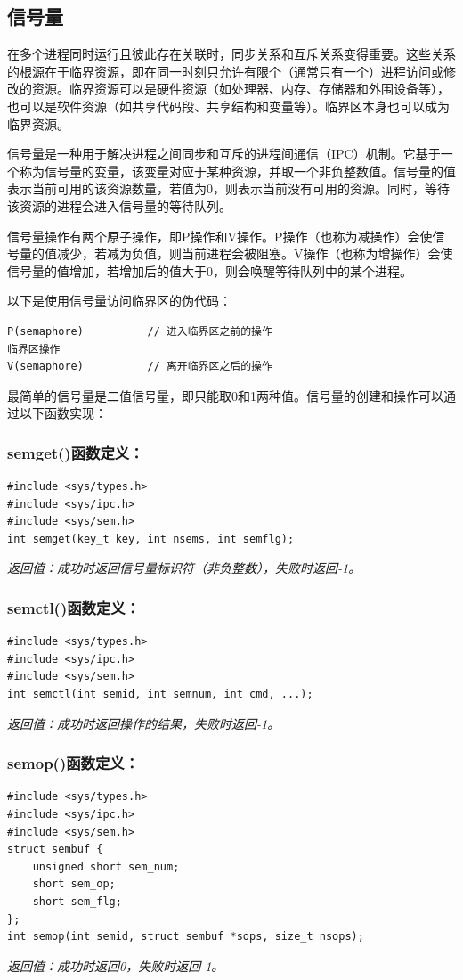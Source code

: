 \documentclass[12pt, a4paper, oneside]{ctexbook}
\numberwithin{figure}{section}
\begin{document}
\subsection{信号量}
在多个进程同时运行且彼此存在关联时，同步关系和互斥关系变得重要。这些关系的根源在于临界资源，即在同一时刻只允许有限个（通常只有一个）进程访问或修改的资源。临界资源可以是硬件资源（如处理器、内存、存储器和外围设备等），也可以是软件资源（如共享代码段、共享结构和变量等）。临界区本身也可以成为临界资源。

信号量是一种用于解决进程之间同步和互斥的进程间通信（IPC）机制。它基于一个称为信号量的变量，该变量对应于某种资源，并取一个非负整数值。信号量的值表示当前可用的该资源数量，若值为0，则表示当前没有可用的资源。同时，等待该资源的进程会进入信号量的等待队列。

信号量操作有两个原子操作，即P操作和V操作。P操作（也称为减操作）会使信号量的值减少，若减为负值，则当前进程会被阻塞。V操作（也称为增操作）会使信号量的值增加，若增加后的值大于0，则会唤醒等待队列中的某个进程。

以下是使用信号量访问临界区的伪代码：
\begin{verbatim}
P(semaphore)          // 进入临界区之前的操作
临界区操作
V(semaphore)          // 离开临界区之后的操作
\end{verbatim}

最简单的信号量是二值信号量，即只能取0和1两种值。信号量的创建和操作可以通过以下函数实现：

\subsubsection{semget()函数定义：}
\begin{verbatim}
#include <sys/types.h>
#include <sys/ipc.h>
#include <sys/sem.h>
int semget(key_t key, int nsems, int semflg);
\end{verbatim}
\emph{返回值：成功时返回信号量标识符（非负整数），失败时返回-1。}

\subsubsection{semctl()函数定义：}
\begin{verbatim}
#include <sys/types.h>
#include <sys/ipc.h>
#include <sys/sem.h>
int semctl(int semid, int semnum, int cmd, ...);
\end{verbatim}
\emph{返回值：成功时返回操作的结果，失败时返回-1。}

\subsubsection{semop()函数定义：}
\begin{verbatim}
#include <sys/types.h>
#include <sys/ipc.h>
#include <sys/sem.h>
struct sembuf {
    unsigned short sem_num;
    short sem_op;
    short sem_flg;
};
int semop(int semid, struct sembuf *sops, size_t nsops);
\end{verbatim}
\emph{返回值：成功时返回0，失败时返回-1。}
\end{document}
